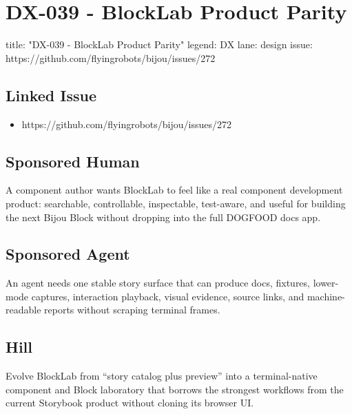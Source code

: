 \chapter{DX-039 - BlockLab Product Parity}\label{record-135}

\smallskip

\begin{RecordMeta}
title: "DX-039 - BlockLab Product Parity"
legend: DX
lane: design
issue: https://github.com/flyingrobots/bijou/issues/272

\end{RecordMeta}

\section{Linked Issue}\label{record-135-linked-issue}

\begin{itemize}
\tightlist
\item
  https://github.com/flyingrobots/bijou/issues/272
\end{itemize}

\section{Sponsored Human}\label{record-135-sponsored-human}

A component author wants BlockLab to feel like a real component development product: searchable, controllable, inspectable, test-aware, and useful for building the next Bijou Block without dropping into the full DOGFOOD docs app.

\section{Sponsored Agent}\label{record-135-sponsored-agent}

An agent needs one stable story surface that can produce docs, fixtures, lower-mode captures, interaction playback, visual evidence, source links, and machine-readable reports without scraping terminal frames.

\section{Hill}\label{record-135-hill}

Evolve BlockLab from ``story catalog plus preview'' into a terminal-native component and Block laboratory that borrows the strongest workflows from the current Storybook product without cloning its browser UI.

